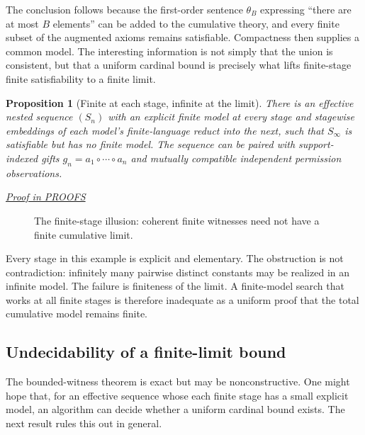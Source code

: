 \documentclass[11pt,letterpaper]{article}
\newtheorem{proposition}[theorem]{Proposition}
\theoremstyle{definition}\newtheorem{definition}[theorem]{Definition}\newtheorem{example}[theorem]{Example}
\theoremstyle{remark}\newtheorem{remark}[theorem]{Remark}
\newcommand{\prooflink}[1]{\par\noindent\hfill\small\hyperref[#1]{\textit{Proof in PROOFS}}\normalsize}
\begin{document}
The conclusion follows because the first-order sentence $\theta_B$ expressing ``there are at most $B$ elements'' can be added to the cumulative theory, and every finite subset of the augmented axioms remains satisfiable. Compactness then supplies a common model. The interesting information is not simply that the union is consistent, but that a uniform cardinal bound is precisely what lifts finite-stage finite satisfiability to a finite limit.

\begin{proposition}[Finite at each stage, infinite at the limit]\label{w2:prop:escape}
There is an effective nested sequence $(S_n)$ with an explicit finite model at every stage and stagewise embeddings of each model's finite-language reduct into the next, such that $S_\infty$ is satisfiable but has \emph{no} finite model. The sequence can be paired with support-indexed gifts $g_n=a_1\circ\cdots\circ a_n$ and mutually compatible independent permission observations.
\prooflink{w2:pr:escape}
\end{proposition}

\begin{figure}[htbp]\centering
{}
\caption{The finite-stage illusion: coherent finite witnesses need not have a finite cumulative limit.}
\end{figure}

Every stage in this example is explicit and elementary. The obstruction is not contradiction: infinitely many pairwise distinct constants may be realized in an infinite model. The failure is finiteness of the limit. A finite-model search that works at all finite stages is therefore inadequate as a uniform proof that the total cumulative model remains finite.

\subsection{Undecidability of a finite-limit bound}
The bounded-witness theorem is exact but may be nonconstructive. One might hope that, for an effective sequence whose each finite stage has a small explicit model, an algorithm can decide whether a uniform cardinal bound exists. The next result rules this out in general.
\end{document}
